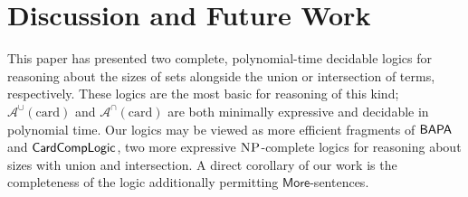\documentclass[letterpaper]{article} %
\theoremstyle{definition}
\newcommand{\Aunion}{\mathscr{A}^{\cup}}
\newcommand{\Ainter}{\mathscr{A}^{\cap}}
\newcommand{\BAPA}{\sf{BAPA}}
\newcommand{\CardCompLogic}{\sf{CardCompLogic}}
\newcommand{\NP}{\textsc{NP}}
\newcommand{\MoreNoArgs}{\mathsf{More}}
\newcommand{\card}{\mathrm{card}}
\begin{document}
\section{Discussion and Future Work}\label{s:future_work}

This paper has presented two complete, polynomial-time decidable logics for reasoning about the sizes of sets alongside the union or intersection of terms, respectively.  These logics are the most basic for reasoning of this kind; $\Aunion(\card)$ and $\Ainter(\card)$ are both minimally expressive and decidable in polynomial time.  Our logics may be viewed as more efficient fragments of $\BAPA$ and $\CardCompLogic$, two more expressive $\NP$-complete logics for reasoning about sizes with union and intersection.  A direct corollary of our work is the completeness of the logic additionally permitting $\MoreNoArgs$-sentences.
\end{document}
